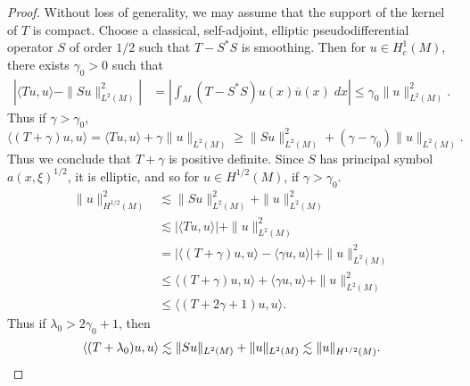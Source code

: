 \begin{proof}
    Without loss of generality, we may assume that the support of the kernel of $T$ is compact. Choose a classical, self-adjoint, elliptic pseudodifferential operator $S$ of order $1/2$ such that $T - S^* S$ is smoothing. Then for $u \in H^1_c(M)$, there exists $\gamma_0 > 0$ such that
    \begin{align*}
        \left| \langle Tu, u \rangle - \| Su \|_{L^2(M)}^2 \right| &= \left| \int_M (T - S^* S) u(x) \overline{u}(x)\; dx \right| \leq \gamma_0 \| u \|_{L^2(M)}^2.
    \end{align*}
    Thus if $\gamma > \gamma_0$,
    \[ \langle (T + \gamma) u, u \rangle = \langle Tu, u \rangle + \gamma \| u \|_{L^2(M)} \geq \| Su \|_{L^2(M)}^2 + (\gamma - \gamma_0) \| u \|_{L^2(M)}. \]
    Thus we conclude that $T + \gamma$ is positive definite. Since $S$ has principal symbol $a(x,\xi)^{1/2}$, it is elliptic, and so for $u \in H^{1/2}(M)$, if $\gamma > \gamma_0$.
    \begin{align*}
        \| u \|_{H^{1/2}(M)}^2 &\lesssim \| Su \|_{L^2(M)}^2 + \| u \|_{L^2(M)}^2\\
        &\lesssim \left| \langle Tu, u \rangle \right| + \| u \|_{L^2(M)}^2\\
        &= |\langle (T + \gamma) u, u \rangle - \langle \gamma u, u \rangle | + \| u \|_{L^2(M)}^2\\
        &\leq \langle (T + \gamma) u, u \rangle + \langle \gamma u, u \rangle + \| u \|_{L^2(M)}^2\\
        &\leq \langle (T + 2\gamma + 1) u , u \rangle.
    \end{align*}
    Thus if $\lambda_0 > 2 \gamma_0 + 1$, then
    \[ \langle (T + \lambda_0) u, u \rangle \lesssim \| Su \|_{L^2(M)} + \| u \|_{L^2(M)} \lesssim \| u \|_{H^{1/2}(M)}. \qedhere \]
\end{proof}

